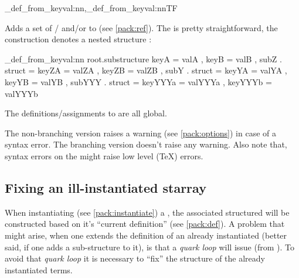 \documentclass[10pt]{article}
\begin{document}
\begin{codedescribe}{\starray_def_from_keyval:nn,\starray_def_from_keyval:nnTF}
\begin{codesyntax}%
\end{codesyntax}

Adds a set of  /  and/or  to  (see \ref{pack:ref}). The  is pretty straightforward, 
the construction  denotes a nested structure :
\end{codedescribe}

\begin{codestore}
\starray_def_from_keyval:nn {root.substructure} 
  {
    keyA = valA ,
    keyB = valB ,
    subZ . struct = 
      {
        keyZA = valZA ,
        keyZB = valZB ,
      }
    subY . struct =
      {
        keyYA = valYA ,
        keyYB = valYB ,
        subYYY . struct =
          {
            keyYYYa = valYYYa ,
            keyYYYb = valYYYb 
          }
      }
  }
\end{codestore}


The definitions/assignments  to  are all global.

\begin{tsremark}
The non-branching version raises a warning (see \ref{pack:options}) in case of a  syntax error. The branching version doesn't raise any warning. Also note that, syntax errors on the  might raise low level (\TeX) errors.
\end{tsremark}

\subsection{Fixing an ill-instantiated starray}\label{pack:def-fix}

When instantiating (see \ref{pack:instantiate}) a , the associated structured will be constructed based on it's ``current definition'' (see \ref{pack:def}). A problem that might arise, when one extends the definition of an already instantiated   (better said, if one adds a sub-structure to it), is that a \textsl{quark loop} will issue (from ). To avoid that  \textsl{quark loop} it is necessary to ``fix'' the structure of the already instantiated terms.
\end{document}
